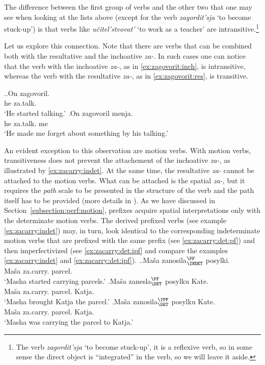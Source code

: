The difference between the first group of verbs and the other two that one may see when looking at the lists above (except for the verb \textit{zagordit'sja} `to become stuck-up') is that verbs like \textit{u\v{c}itel'stvovat'} `to work as a teacher' are intransitive.\footnote{The verb \textit{zagordit'sja} `to become stuck-up', it is a reflexive verb, so in some sense the direct object is ``integrated'' in the verb, so we will leave it aside.}

Let us explore this connection. Note that there are verbs that can be combined both with the resultative and the inchoative \textit{za-}. In such cases one can notice that the verb with the inchoative \textit{za-}, as in \ref{ex:zagovorit:inch}, is intransitive, whereas the verb with the resultative \textit{za-}, as in \ref{ex:zagovorit:res}, is transitive.

\ex.\ag.\label{ex:zagovorit:inch}On zagovoril.\\
he za.talk.\\
\trans `He started talking.'
\bg.\label{ex:zagovorit:res}On zagovoril menja.\\
he za.talk. me\\
\trans `He made me forget about something by his talking.'
 
An evident exception to this observation are motion verbs. With motion verbs, transitiveness does not prevent the attachement of the inchoative \textit{za-}, as illustrated by \ref{ex:zacarry:indet}. At the same time, the resultative \textit{za-} cannot be attached to the motion verbs. What can be attached is the spatial \textit{za-}, but it requires the \textit{path} scale to be presented in the structure of the verb and the path itself has to be provided (more details in \citealt{ZinovaOsswald:paper}). As we have discussed in Section~\ref{subsection:perf:motion}, prefixes acquire spatial interpretations only with the determinate motion verbs. The derived prefixed verbs (see example \ref{ex:zacarry:indet}) may, in turn, look identical to the corresponding indeterminate motion verbs that are prefixed with the same prefix (see \ref{ex:zacarry:det:pf}) and then imperfectivized (see \ref{ex:zacarry:det:ipf} and compare the examples \ref{ex:zacarry:indet} and \ref{ex:zacarry:det:ipf}).
 \ex.\label{ex:zacarry}\ag.\label{ex:zacarry:indet}Ma\v{s}a zanosila$^{\PF}_{\text{\INDET}}$ posylki.\\
 Ma\v{s}a za.carry. parcel.\\
 \trans `Masha started carrying parcels.'
\bg.\label{ex:zacarry:det:pf}Ma\v{s}a zanesla$^{\PF}_{\text{\DET}}$ posylku Kate.\\
 Ma\v{s}a za.carry. parcel. Katja.\\
 \trans `Masha brought Katja the parcel.'
\bg.\label{ex:zacarry:det:ipf}Ma\v{s}a zanosila$^{\IPF}_{\text{\DET}}$ posylku Kate.\\
 Ma\v{s}a za.carry. parcel. Katja.\\
 \trans `Masha was carrying the parcel to Katja.'
 
